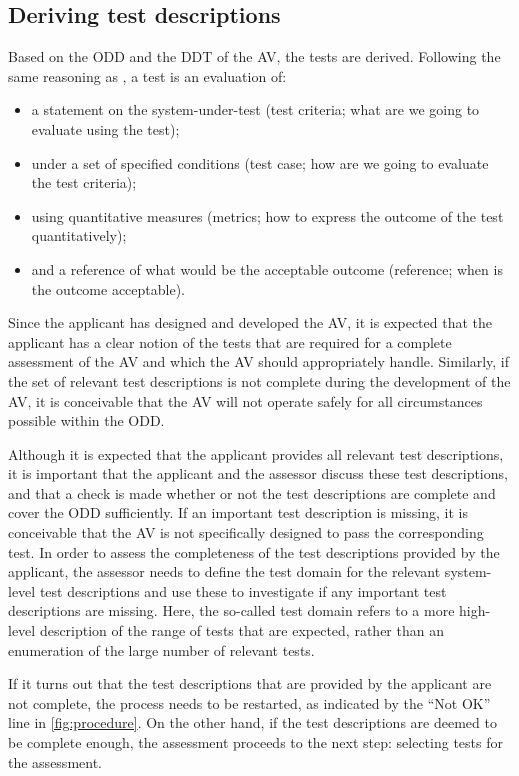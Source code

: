 \subsection{Deriving test descriptions}
\label{sec:test descriptions}

Based on the ODD and the DDT of the AV, the tests are derived. Following the same reasoning as \textcite{stellet2015taxonomy}, a test is an evaluation of:
\begin{itemize}
	\item a statement on the system-under-test (test criteria; what are we going to evaluate using the test);
	\item under a set of specified conditions (test case; how are we going to evaluate the test criteria);
	\item using quantitative measures (metrics; how to express the outcome of the test quantitatively);
	\item and a reference of what would be the acceptable outcome (reference; when is the outcome acceptable).
\end{itemize}

Since the applicant has designed and developed the AV, it is expected that the applicant has a clear notion of the tests that are required for a complete assessment of the AV and which the AV should appropriately handle. Similarly, if the set of relevant test descriptions is not complete during the development of the AV, it is conceivable that the AV will not operate safely for all circumstances possible within the ODD. 

Although it is expected that the applicant provides all relevant test descriptions, it is important that the applicant and the assessor discuss these test descriptions, and that a check is made whether or not the test descriptions are complete and cover the ODD sufficiently. If an important test description is missing, it is conceivable that the AV is not specifically designed to pass the corresponding test. In order to assess the completeness of the test descriptions provided by the applicant, the assessor needs to define the test domain for the relevant system-level test descriptions and use these to investigate if any important test descriptions are missing. Here, the so-called test domain refers to a more high-level description of the range of tests that are expected, rather than an enumeration of the large number of relevant tests.

If it turns out that the test descriptions that are provided by the applicant are not complete, the process needs to be restarted, as indicated by the ``Not OK'' line in \cref{fig:procedure}. On the other hand, if the test descriptions are deemed to be complete enough, the assessment proceeds to the next step: selecting tests for the assessment.



